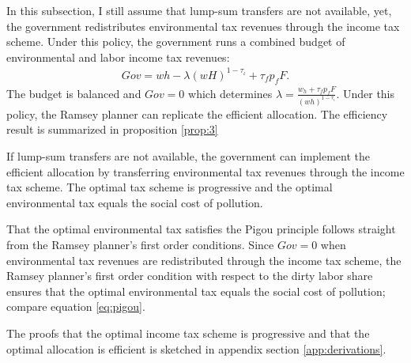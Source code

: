 In this subsection, I still assume that lump-sum transfers are not available, yet, the government redistributes environmental tax revenues through the income tax scheme.
Under this policy, the government runs a combined budget of environmental and labor income tax revenues:  
\begin{align}
Gov= wh-\lambda (wH)^{1-\tau_\iota}+\tau_f p_fF.
\end{align}
The budget is balanced and $Gov = 0$ which determines $\lambda=\frac{w_h + \tau_f p_f F}{(wh)^{1-\tau_{\iota}}}$. 
Under this policy, the Ramsey planner can replicate the efficient allocation. 
The efficiency result is summarized in proposition \ref{prop:3}
\begin{prop}\label{prop:3}
	If lump-sum transfers are not available, the government can implement the efficient allocation by  transferring environmental tax revenues through the income tax scheme. The optimal tax scheme is progressive and the optimal environmental tax equals the social cost of pollution.
\end{prop}

	That the optimal environmental tax satisfies the Pigou principle follows straight from the Ramsey planner's first order conditions. Since $Gov=0$ when environmental tax revenues are redistributed through the income tax scheme, the Ramsey planner's first order condition with respect to the dirty labor share ensures that the optimal environmental tax equals the social cost of pollution; compare equation \ref{eq:pigou}. 
	
	The proofs that the optimal income tax scheme is progressive and that the optimal allocation is efficient is sketched in appendix section \ref{app:derivations}.


\begin{comment}
\begin{prop}
Effect of using progressive income scheme on inequality (maybe as opposed to lump-sum transfers)
\end{prop}

content...
\end{comment}

